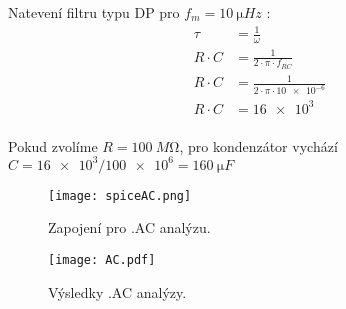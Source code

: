 Natevení filtru typu DP pro \(f_{m} =  \qty{10}{\micro Hz}\) :
\begin{align*}
    \tau &= \frac{1}{\omega} \\
    R\cdot C &= \frac{1}{2\cdot \pi \cdot f_{RC} } \\
    R\cdot C &= \frac{1}{2\cdot \pi \cdot \num{10e-6} } \\
    R\cdot C &= \num{16e3} \\
\end{align*}

Pokud zvolíme \(R=\qty{100}{M\ohm}\), pro kondenzátor vychází \(C=\num{16e3}/\num{100e6} = \qty{160}{\micro F}\) 

\begin{figure}[h!]
    \centering
    \texttt{[image: spiceAC.png]}
    \caption{Zapojení pro .AC analýzu.}
    \label{fig:spiceAC.png}
\end{figure}

\begin{figure}[h!]
    \centering
    \texttt{[image: AC.pdf]}
    \caption{Výsledky .AC analýzy.}
    \label{fig:AC.pdf}
\end{figure}


